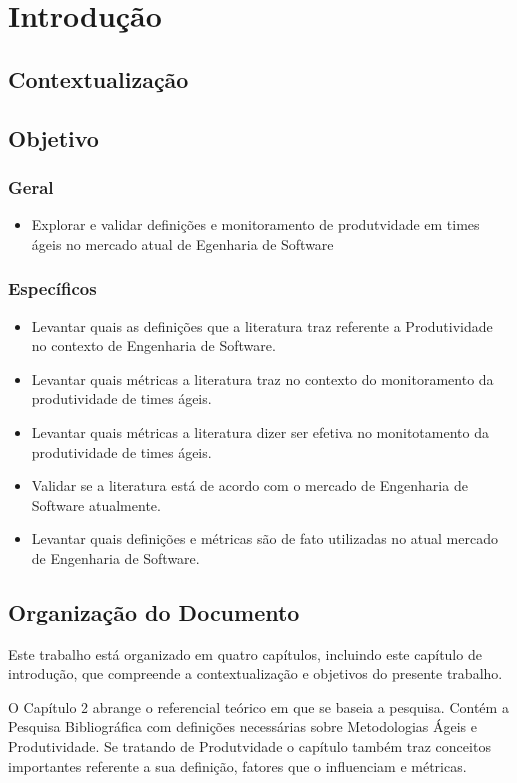 \chapter[Introdução]{Introdução}

\section{Contextualização}
\section{Objetivo}
\subsection{Geral}
\begin{itemize}
  \item Explorar e validar definições e monitoramento de produtvidade em times ágeis no mercado atual de Egenharia de Software
\end{itemize}
\subsection{Específicos}
\begin{itemize}
  \item Levantar quais as definições que a literatura traz referente a Produtividade no contexto de Engenharia de Software.
  \item Levantar quais métricas a literatura traz no contexto do monitoramento da produtividade de times ágeis.
  \item Levantar quais métricas a literatura dizer ser efetiva no monitotamento da produtividade de times ágeis.
  \item Validar se a literatura  está de acordo com o mercado de Engenharia de Software atualmente.
  \item Levantar quais definições e métricas são de fato utilizadas no atual mercado de Engenharia de Software.
\end{itemize}

\section{Organização do Documento}

  Este trabalho está organizado em quatro capítulos, incluindo este capítulo de introdução, que compreende a contextualização e objetivos do presente trabalho.

  O Capítulo 2 abrange o referencial teórico em que se baseia a pesquisa. Contém a Pesquisa Bibliográfica com definições necessárias sobre Metodologias Ágeis
  e Produtividade.  Se tratando de Produtvidade o capítulo também traz conceitos importantes referente a sua definição, fatores que o influenciam e métricas.

